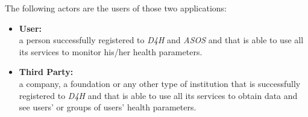 The following actors are the users of those two applications:

\begin{itemize}
	\item{\textbf{User:}\\ a person successfully registered to \textit{D4H} and \textit{ASOS} and that is able to use all its 				services to monitor his/her health parameters.}

	\item{\textbf{Third Party:}\\ a company, a foundation or any other type of institution that is successfully registered to 				\textit{D4H} and that is able to use all its services to obtain data and see users' or groups of users' health parameters.}
\end{itemize}
